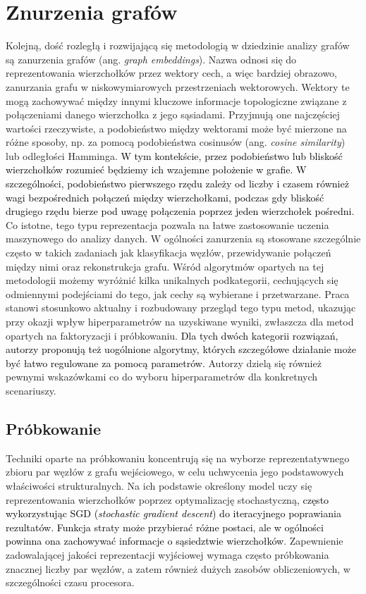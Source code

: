\section{Znurzenia grafów}
    Kolejną, dość rozległą i rozwijającą się metodologią w dziedzinie analizy grafów są zanurzenia grafów (ang. \textit{graph embeddings}). Nazwa odnosi się do reprezentowania wierzchołków przez wektory cech, a więc bardziej obrazowo, zanurzania grafu w niskowymiarowych przestrzeniach wektorowych. Wektory te mogą zachowywać między innymi kluczowe informacje topologiczne związane z połączeniami danego wierzchołka z jego sąsiadami. Przyjmują one najczęściej wartości rzeczywiste, a podobieństwo między wektorami może być mierzone na różne sposoby, np.  za pomocą podobieństwa cosinusów (ang. \textit{cosine similarity}) lub odległości Hamminga\cite{Lian_Zheng_Zheng_Ge_Cao_Tsang_Xie_2018}. \textcolor{black}{W tym kontekście, przez podobieństwo lub bliskość wierzchołków rozumieć będziemy ich wzajemne położenie w grafie. W szczególności, podobieństwo pierwszego rzędu zależy od liczby i czasem również wagi bezpośrednich połączeń między wierzchołkami, podczas gdy bliskość drugiego rzędu bierze pod uwagę połączenia poprzez jeden wierzchołek pośredni.} Co istotne, tego typu reprezentacja pozwala na łatwe zastosowanie uczenia maszynowego do analizy danych. W ogólności zanurzenia są stosowane szczególnie często w takich zadaniach jak klasyfikacja węzłów, przewidywanie połączeń między nimi oraz rekonstrukcja grafu. Wśród algorytmów opartych na tej metodologii możemy wyróżnić kilka unikalnych podkategorii, cechujących się odmiennymi podejściami do tego, jak cechy są wybierane i przetwarzane. Praca 
    \cite{Yang_Qu_Hussein_Rosso_Cudré-Mauroux_Liu_2023} stanowi stosunkowo aktualny i rozbudowany przegląd tego typu metod, ukazując przy okazji wpływ hiperparametrów na uzyskiwane wyniki, zwłaszcza dla metod opartych na faktoryzacji i próbkowaniu. \textcolor{black}{Dla tych dwóch kategorii rozwiązań, autorzy proponują też uogólnione algorytmy, których szczegółowe działanie może być łatwo regulowane za pomocą parametrów.} Autorzy dzielą się również pewnymi wskazówkami co do wyboru hiperparametrów dla konkretnych scenariuszy. 

    \subsection{Próbkowanie}
        Techniki oparte na próbkowaniu koncentrują się na wyborze reprezentatywnego zbioru par węzłów z grafu wejściowego, w celu uchwycenia jego podstawowych właściwości strukturalnych. Na ich podstawie określony model uczy się reprezentowania wierzchołków poprzez optymalizację stochastyczną, \textcolor{black}{często wykorzystując SGD (\textit{stochastic gradient descent}) do iteracyjnego poprawiania rezultatów. Funkcja straty może przybierać różne postaci, ale w ogólności powinna ona zachowywać informacje o sąsiedztwie wierzchołków}. Zapewnienie zadowalającej jakości reprezentacji wyjściowej wymaga często próbkowania znacznej liczby par węzłów, a zatem również dużych zasobów obliczeniowych, w szczególności czasu procesora.
            
